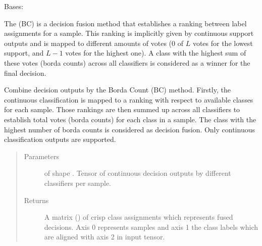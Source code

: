 \documentclass[letterpaper,10pt,english]{sphinxmanual}
\begin{document}
\begin{fulllineitems}
\label{\detokenize{pusion.core.borda_count_combiner:pusion.core.borda_count_combiner.BordaCountCombiner}}
\sphinxAtStartPar
Bases: {\hyperref[\detokenize{pusion.core.combiner:pusion.core.combiner.UtilityBasedCombiner}]{}}

\sphinxAtStartPar
The {\hyperref[\detokenize{pusion.core.borda_count_combiner:pusion.core.borda_count_combiner.BordaCountCombiner}]{}} (BC) is a decision fusion method that establishes a ranking between label
assignments for a sample. This ranking is implicitly given by continuous support outputs and is mapped to different
amounts of votes (\(0\) of \(L\) votes for the lowest support, and \(L-1\) votes for the highest one).
A class with the highest sum of these votes (borda counts) across all classifiers is considered as a winner for the
final decision.

\begin{fulllineitems}
\label{\detokenize{pusion.core.borda_count_combiner:pusion.core.borda_count_combiner.BordaCountCombiner.combine}}
\sphinxAtStartPar
Combine decision outputs by the Borda Count (BC) method. Firstly, the continuous classification is mapped to a
ranking with respect to available classes for each sample. Those rankings are then summed up across all
classifiers to establish total votes (borda counts) for each class in a sample. The class with the highest
number of borda counts is considered as decision fusion. Only continuous classification outputs are supported.
\begin{quote}\begin{description}
\item[{Parameters}] \leavevmode
\sphinxAtStartPar
{} \textendash{}  of shape .
Tensor of continuous decision outputs by different classifiers per sample.

\item[{Returns}] \leavevmode
\sphinxAtStartPar
A matrix () of crisp class assignments which represents fused decisions.
Axis 0 represents samples and axis 1 the class labels which are aligned with axis 2 in
 input tensor.

\end{description}\end{quote}

\end{fulllineitems}


\end{fulllineitems}
\end{document}
